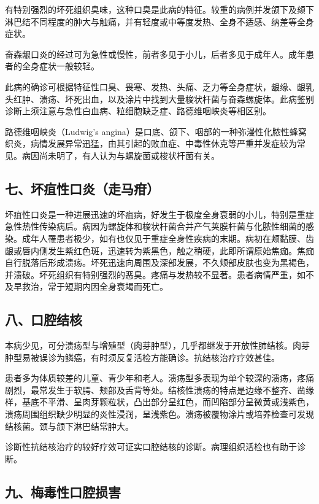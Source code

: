 有特别强烈的坏死组织臭味，这种口臭是此病的特征。较重的病例并发颌下及颏下淋巴结不同程度的肿大与触痛，并有轻度或中等度发热、全身不适感、纳差等全身症状。

奋森龈口炎的经过可为急性或慢性，前者多见于小儿，后者多见于成年人。成年患者的全身症状一般较轻。

此病的确诊可根据特征性口臭、畏寒、发热、头痛、乏力等全身症状，龈缘、龈乳头红肿、溃疡、坏死出血，以及涂片中找到大量梭状杆菌与奋森螺旋体。此病鉴别诊断上须注意与急性白血病、粒细胞缺乏症、路德维咽峡炎等相区别。

路德维咽峡炎（Ludwig's
angina）是口底、颌下、咽部的一种弥漫性化脓性蜂窝织炎，病情发展异常迅猛，由其引起的败血症、中毒性休克等严重并发症较为常见。病因尚未明了，有人认为与螺旋菌或梭状杆菌有关。

\subsection{七、坏疽性口炎（走马疳）}

坏疽性口炎是一种进展迅速的坏疽病，好发生于极度全身衰弱的小儿，特别是重症急性热性传染病后。病因为螺旋体和梭状杆菌合并产气荚膜杆菌与化脓性细菌的感染。成年人罹患者极少，如有也仅见于重症全身性疾病的末期。病初在颊黏膜、齿龈或唇内侧发生紫红色斑，迅速转为紫黑色，触之稍硬，此即所谓原始焦痂。焦痂自行脱落后形成溃疡。坏死迅速向周围及深部发展，不久颊部皮肤也变为黑褐色，并溃破。坏死组织有特别强烈的恶臭。疼痛与发热较不显著。患者病情严重，如不及早救治，常于短期内因全身衰竭而死亡。

\subsection{八、口腔结核}

本病少见，可分溃疡型与增殖型（肉芽肿型），几乎都继发于开放性肺结核。肉芽肿型易被误诊为鳞癌，有时须反复活检方能确诊。抗结核治疗疗效甚佳。

患者多为体质较差的儿童、青少年和老人。溃疡型多表现为单个较深的溃疡，疼痛剧烈，最常发生于软腭、颊部及舌背等处。结核性溃疡的特点是边缘不整齐、凿缘样，基底不平滑、呈肉芽颗粒状，凸出部分呈红色，而凹陷部分呈微黄或浅紫色，溃疡周围组织缺少明显的炎性浸润，呈浅紫色。溃疡被覆物涂片或培养检查可发现结核菌。颈与颌下淋巴结常肿大。

诊断性抗结核治疗的较好疗效可证实口腔结核的诊断。病理组织活检也有助于诊断。

\subsection{九、梅毒性口腔损害}

